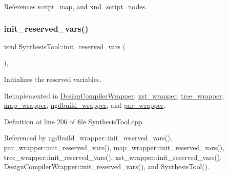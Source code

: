 References script\+\_\+map, and xml\+\_\+script\+\_\+nodes.

\mbox{\label{classSynthesisTool_a85b4a4fa0cc60e5325a79d7479c505b7}} 
\subsubsection{\texorpdfstring{init\+\_\+reserved\+\_\+vars()}{init\_reserved\_vars()}}
{\footnotesize\ttfamily void Synthesis\+Tool\+::init\+\_\+reserved\+\_\+vars (\begin{DoxyParamCaption}{ }\end{DoxyParamCaption})\hspace{0.3cm}{\ttfamily [protected]}, {\ttfamily [virtual]}}



Initializes the reserved variables. 



Reimplemented in \hyperlink{classDesignCompilerWrapper_ac1adc09c852d3103b975cf53240b36ea}{Design\+Compiler\+Wrapper}, \hyperlink{classxst__wrapper_a31f5b1a54ab117aaf0c0657854801fa4}{xst\+\_\+wrapper}, \hyperlink{classtrce__wrapper_a2b7b95bfdd4395bcd8bfedabafbb071b}{trce\+\_\+wrapper}, \hyperlink{classmap__wrapper_a206084d1b97e49db459560b12e6175df}{map\+\_\+wrapper}, \hyperlink{classngdbuild__wrapper_a5be42dfc012dc28753f35ddddd890181}{ngdbuild\+\_\+wrapper}, and \hyperlink{classpar__wrapper_a25c7424ba2105125054cad920450bc6e}{par\+\_\+wrapper}.



Definition at line 206 of file Synthesis\+Tool.\+cpp.



Referenced by ngdbuild\+\_\+wrapper\+::init\+\_\+reserved\+\_\+vars(), par\+\_\+wrapper\+::init\+\_\+reserved\+\_\+vars(), map\+\_\+wrapper\+::init\+\_\+reserved\+\_\+vars(), trce\+\_\+wrapper\+::init\+\_\+reserved\+\_\+vars(), xst\+\_\+wrapper\+::init\+\_\+reserved\+\_\+vars(), Design\+Compiler\+Wrapper\+::init\+\_\+reserved\+\_\+vars(), and Synthesis\+Tool().

